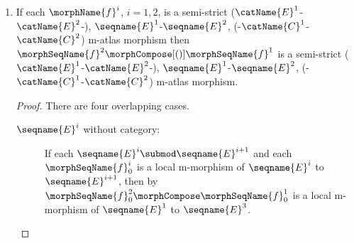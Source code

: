 \documentclass{article}
\begin{document}
\begin{lemma}
\begin{enumerate}
\begin{proof}
\begin{figure}[ht]
\[ \bfig
\node x(0,-1000)[u^1]
\node up1(500,0)[U'^1]
\node upp1(500,-1000)[U''^1]
\node vpp1(500,-2000)[V''^1]
\node vp1(500,-2500)[V'^1]
\node up2(1500,0)[U'^2]
\node uint(1500,-500)[{I^{2,3} = U'^2 \cap \morphName{f}^{-1}_0[U^3]}]
\node upp2(1500,-1000)[U''^2]
\node vpp2(1500,-2000)[V''^2]
\node vhp2(1500,-2500)[\hat{V}'^2]
\node E3(2500,0)[E^3]
\node u3(2500,-500)[U^3]
\node up3(2500,-1000)[U'^3]
\node vhp3(2500,-2000)[\hat{V}'^3]
\node v3(2500,-1500)[V^3]
\node c3(2500,-2500)[C^3]
\arrow |a|/^{ (}->/[x`upp1;\morphName{i}]
\arrow |a|[up1`up2;\morphName{f}^1_0]
\arrow |r|/^{ (}->/[upp1`up1;\morphName{i}]
\arrow |a|[upp1`upp2;\morphName{f}^1_0]
\arrow |r|/>->>/[upp1`vpp1;\phi^1]
\arrow |l|//[upp1`vpp1;\iso]
\arrow |a|[vpp1`vpp2;\morphName{f}^1_1]
\arrow |r|/^{ (}->/[vpp1`vp1;\morphName{i}]
\arrow |a|[vp1`vhp2;\morphName{f}^1_1]
\arrow |a|[up2`E3;\morphName{f}^2_0]
\arrow |r|/^{ (}->/[uint`up2;\morphName{i}]
\arrow |a|[uint`u3;\morphName{f}^2_0]
\arrow |r|/^{ (}->/[upp2`uint;\morphName{i}]
\arrow |a|[upp2`up3;\morphName{f}^2_0]
\arrow |r|/>->>/[upp2`vpp2;\phi'^2]
\arrow |l|//[upp2`vpp2;\iso]
\arrow |a|[vpp2`vhp3;\morphName{f}^2_1]
\arrow |a|/^{ (}->/[vpp2`vhp2;\morphName{i}]
\arrow |a|[vhp2`c3;\morphName{f}^2_1]
\arrow |r|/^{ (}->/[u3`E3;\morphName{i}]
\arrow |r|/^{ (}->/[up3`u3;\morphName{i}]
\arrow |r|/>->>/[up3`vhp3;\phi'^3]
\arrow |l|//[up3`vhp3;\iso]
\arrow |r|/^{ (}->/[vhp3`c3;\morphName{i}]
\efig \]
\caption{Completed composition of M-atlas morphisms}
\label{fig:morphcompM3}
\end{figure}

Define $U''^1 \defeq \morphName{f}^{1-1}_0[U''^2]$,
$
  V''^1 \defeq
  \morphName{f}^{1-1}_1[V''^2] =
  \phi^1[U''^1]
$,
 is commutative.
\end{proof}

\item
\label{M-morphcomp:semicompsemi}
If each $\morphName{f}^i$, $i=1,2$, is a semi-strict
\nobreaks
  {
    {($\catName{E}^1$-$\catName{E}^2$-)},
    {$\seqname{E}^1$-$\seqname{E}^2$},
    {(-$\catName{C}^1$-$\catName{C}^2$)}
  }
m-atlas morphism
then $\morphSeqName{f}^2 \morphCompose[()] \morphSeqName{f}^1$ is a semi-strict
\nobreaks
  {
    {($\catName{E}^1$-$\catName{E}^2$-)},
    {$\seqname{E}^1$-$\seqname{E}^2$},
    {(-$\catName{C}^1$-$\catName{C}^2$)}
  }
m-atlas morphism.

\begin{proof}
There are four overlapping cases.
\begin{description}
\item[$\seqname{E}^i$ without category:]
If each $\seqname{E}^i \submod \seqname{E}^{i+1}$ and each
$\morphSeqName{f}^i_0$ is a local m-morphism of $\seqname{E}^i$ to
$\seqname{E}^{i+1}$, then by 
$\morphSeqName{f}^2_0 \morphCompose \morphSeqName{f}^1_0$ is a local
m-morphism of $\seqname{E}^1$ to $\seqname{E}^3$.


\end{description}
\end{proof}
\end{enumerate}
\end{lemma}
\end{document}

